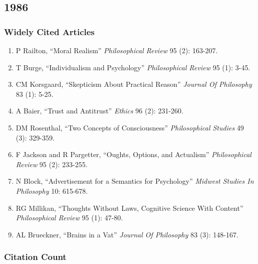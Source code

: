 \documentclass[
  10pt,
  letterpaper,
  DIV=11,
  numbers=noendperiod,
  twoside]{scrartcl}
\providecommand{\tightlist}{%
  \setlength{\itemsep}{0pt}\setlength{\parskip}{0pt}}\usepackage{longtable,booktabs,array}
\begin{document}
\newpage

\subsection{1986}\label{section-10}

\subsubsection*{Widely Cited Articles}\label{widely-cited-articles-10}

\begin{enumerate}
\def\labelenumi{\arabic{enumi}.}
\tightlist
\item
  P Railton, ``Moral Realism'' \emph{Philosophical Review} 95 (2):
  163-207.
\item
  T Burge, ``Individualism and Psychology'' \emph{Philosophical Review}
  95 (1): 3-45.
\item
  CM Korsgaard, ``Skepticism About Practical Reason'' \emph{Journal Of
  Philosophy} 83 (1): 5-25.
\item
  A Baier, ``Trust and Antitrust'' \emph{Ethics} 96 (2): 231-260.
\item
  DM Rosenthal, ``Two Concepts of Consciousness'' \emph{Philosophical
  Studies} 49 (3): 329-359.
\item
  F Jackson and R Pargetter, ``Oughts, Options, and Actualism''
  \emph{Philosophical Review} 95 (2): 233-255.
\item
  N Block, ``Advertisement for a Semantics for Psychology''
  \emph{Midwest Studies In Philosophy} 10: 615-678.
\item
  RG Millikan, ``Thoughts Without Laws, Cognitive Science With Content''
  \emph{Philosophical Review} 95 (1): 47-80.
\item
  AL Brueckner, ``Brains in a Vat'' \emph{Journal Of Philosophy} 83 (3):
  148-167.
\end{enumerate}

\subsubsection*{Citation Count}\label{citation-count-10}
\end{document}
